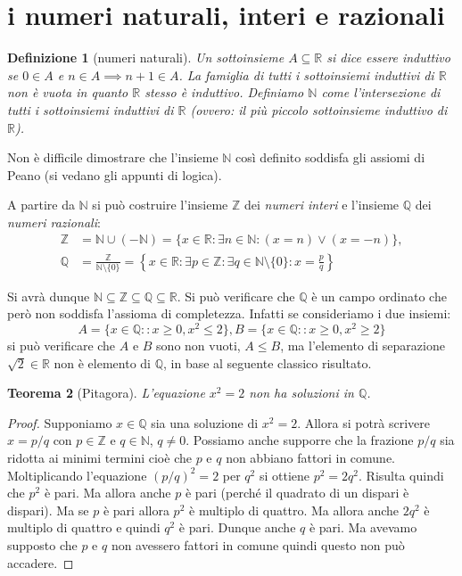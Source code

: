 \documentclass[italian,a4paper,oneside,headinclude]{scrbook}
\newcommand{\myemph}[1]{\emph{#1}\marginpar{#1}}
\renewcommand{\subset}{\subseteq}
\newcommand{\NN}{\mathbb N}
\newcommand{\QQ}{\mathbb Q}
\newcommand{\RR}{\mathbb R}
\newcommand{\ZZ}{\mathbb Z}
\newtheorem{theorem}{Teorema}
\newtheorem{definition}[theorem]{Definizione}
\begin{document}
\section{i numeri naturali, interi e razionali}

\begin{definition}[numeri naturali]
Un sottoinsieme $A\subset \RR$ si dice essere \emph{induttivo}
se $0\in A$ e $n\in A \implies n+1 \in A$.
La famiglia di tutti i sottoinsiemi induttivi di $\RR$ non è vuota
in quanto $\RR$ stesso è induttivo. Definiamo $\NN$ come l'intersezione
di tutti i sottoinsiemi induttivi di $\RR$ (ovvero: il più piccolo sottoinsieme induttivo di $\RR$).
\marginpar{$\NN$}
\end{definition}

Non è difficile dimostrare che l'insieme $\NN$ così definito
soddisfa gli assiomi di Peano (si vedano gli appunti di logica).

A partire da $\NN$ si può costruire l'insieme $\ZZ$ dei
\myemph{numeri interi}
\marginpar{$\ZZ$}
e l'insieme $\QQ$ dei \myemph{numeri razionali}:
\marginpar{$\QQ$}
\begin{align*}
  \ZZ
    &= \NN \cup (-\NN)
    = \{x\in \RR\colon \exists n\in\NN\colon (x=n) \lor (x=-n)\}, \\
  \QQ
    &= \frac{\ZZ}{\NN\setminus\{0\}}
    = \left\{x \in \RR\colon \exists p\in \ZZ\colon \exists q \in \NN\setminus\{0\}\colon x = \frac{p}{q}\right\}
\end{align*}

Si avrà dunque $\NN \subset \ZZ \subset \QQ \subset \RR$.
Si può verificare che $\QQ$ è un campo ordinato che però non soddisfa l'assioma
di completezza.
Infatti se consideriamo i due insiemi:
\[
 A = \{x\in \QQ: \colon x\ge 0, x^2 \le 2\},
 B = \{x\in \QQ: \colon x\ge 0, x^2 \ge 2\}
\]
si può verificare che $A$ e $B$ sono non vuoti, $A \le B$, ma l'elemento
di separazione $\sqrt{2}\in \RR$ non è elemento di $\QQ$, in base al seguente
classico risultato.

\begin{theorem}[Pitagora]
L'equazione $x^2=2$ non ha soluzioni in $\QQ$.
\end{theorem}
%
\begin{proof}
Supponiamo $x\in \QQ$ sia una soluzione di $x^2=2$.
Allora si potrà scrivere $x=p/q$ con $p\in \ZZ$ e $q\in \NN$, $q\neq 0$.
Possiamo anche supporre che la frazione $p/q$ sia ridotta ai minimi
termini cioè che $p$ e $q$ non abbiano fattori in comune.
Moltiplicando l'equazione
$(p/q)^2=2$ per $q^2$ si ottiene $p^2 = 2 q^2$.
Risulta quindi che $p^2$ è pari.
Ma allora anche $p$ è pari (perché il quadrato di un dispari è dispari).
Ma se $p$ è pari allora $p^2$ è multiplo di quattro.
Ma allora anche $2q^2$ è multiplo di quattro e quindi $q^2$ è pari.
Dunque anche $q$ è pari. Ma avevamo supposto che $p$ e $q$ non avessero
fattori in comune quindi questo non può accadere.
\end{proof}
\end{document}
